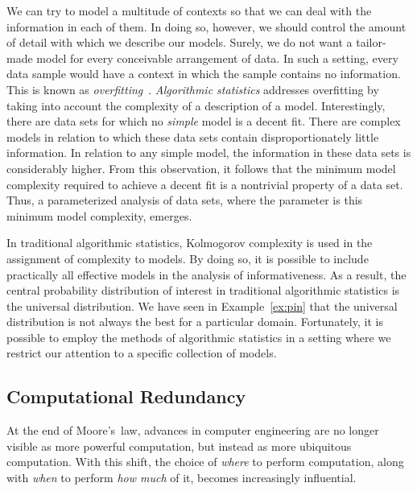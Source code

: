 We can try to model a multitude of contexts so that we can deal with the information in each of them.
In doing so, however, we should control the amount of detail with which we describe our models.
Surely, we do not want a tailor-made model for every conceivable arrangement of data.
In such a setting, every data sample would have a context in which the sample contains no information.
This is known as \emph{overfitting}~\parencite{grunwald2007minimum}.
\emph{Algorithmic statistics} addresses overfitting by taking into account the complexity of a description of a model.
Interestingly, there are data sets for which no \emph{simple} model is a decent fit.
There are complex models in relation to which these data sets contain disproportionately little information.
In relation to any simple model, the information in these data sets is considerably higher.
From this observation, it follows that the minimum model complexity required to achieve a decent fit is a nontrivial property of a data set.
Thus, a parameterized analysis of data sets, where the parameter is this minimum model complexity, emerges.

In traditional algorithmic statistics, Kolmogorov complexity is used in the assignment of complexity to models.
By doing so, it is possible to include practically all effective models in the analysis of informativeness.
As a result, the central probability distribution of interest in traditional algorithmic statistics is the universal distribution.
We have seen in Example~\ref{ex:pin} that the universal distribution is not always the best for a particular domain.
Fortunately, it is possible to employ the methods of algorithmic statistics in a setting where we restrict our attention to a specific collection of models.

\subsection{Computational Redundancy}
At the end of Moore's~law, advances in computer engineering are no longer visible as more powerful computation, but instead as more ubiquitous computation.
With this shift, the choice of \emph{where} to perform computation, along with \emph{when} to perform \emph{how much} of it, becomes increasingly influential.

